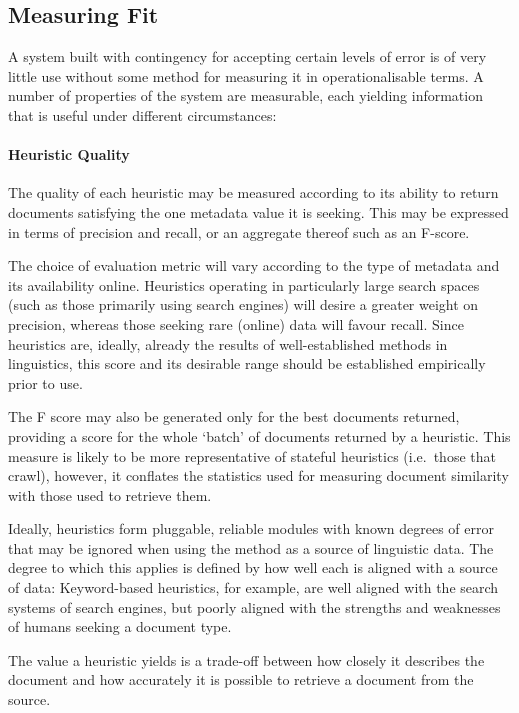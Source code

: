 \subsection{Measuring Fit}
A system built with contingency for accepting certain levels of error is of very little use without some method for measuring it in operationalisable terms. A number of properties of the system are measurable, each yielding information that is useful under different circumstances:


\paragraph{Heuristic Quality}
The quality of each heuristic may be measured according to its ability to return documents satisfying the one metadata value it is seeking.  This may be expressed in terms of precision and recall, or an aggregate thereof such as an F-score.

The choice of evaluation metric will vary according to the type of metadata and its availability online.  Heuristics operating in particularly large search spaces (such as those primarily using search engines) will desire a greater weight on precision, whereas those seeking rare (online) data will favour recall.  Since heuristics are, ideally, already the results of well-established methods in linguistics, this score and its desirable range should be established empirically prior to use.

The F score may also be generated only for the best documents returned, providing a score for the whole `batch' of documents returned by a heuristic.  This measure is likely to be more representative of stateful heuristics (i.e.\ those that crawl), however, it conflates the statistics used for measuring document similarity with those used to retrieve them.

Ideally, heuristics form pluggable, reliable modules with known degrees of error that may be ignored when using the method as a source of linguistic data.  The degree to which this applies is defined by how well each is aligned with a source of data: Keyword-based heuristics, for example, are well aligned with the search systems of search engines, but poorly aligned with the strengths and weaknesses of humans seeking a document type.

The value a heuristic yields is a trade-off between how closely it describes the document and how accurately it is possible to retrieve a document from the source. 


